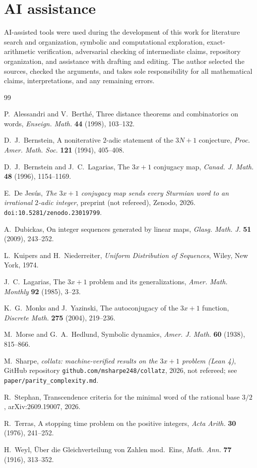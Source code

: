 \documentclass[11pt]{amsart}
\theoremstyle{definition}
\theoremstyle{remark}
\begin{document}
\section*{AI assistance}

AI-assisted tools were used during the development of this work for literature search and organization, symbolic and computational exploration, exact-arithmetic verification, adversarial checking of intermediate claims, repository organization, and assistance with drafting and editing. The author selected the sources, checked the arguments, and takes sole responsibility for all mathematical claims, interpretations, and any remaining errors.

\begin{thebibliography}{99}

 P.~Alessandri and V.~Berth\'e, Three distance theorems and combinatorics on words, \emph{Enseign. Math.} \textbf{44} (1998), 103--132.

 D.~J.~Bernstein, A noniterative $2$-adic statement of the $3N+1$ conjecture, \emph{Proc. Amer. Math. Soc.} \textbf{121} (1994), 405--408.

 D.~J.~Bernstein and J.~C.~Lagarias, The $3x+1$ conjugacy map, \emph{Canad. J. Math.} \textbf{48} (1996), 1154--1169.

 E.~De Jes\'us, \emph{The $3x+1$ conjugacy map sends every Sturmian word to an irrational $2$-adic integer}, preprint (not refereed), Zenodo, 2026. \texttt{doi:10.5281/zenodo.23019799}.

 A.~Dubickas, On integer sequences generated by linear maps, \emph{Glasg. Math. J.} \textbf{51} (2009), 243--252.

 L.~Kuipers and H.~Niederreiter, \emph{Uniform Distribution of Sequences}, Wiley, New York, 1974.

 J.~C.~Lagarias, The $3x+1$ problem and its generalizations, \emph{Amer. Math. Monthly} \textbf{92} (1985), 3--23.

 K.~G.~Monks and J.~Yazinski, The autoconjugacy of the $3x+1$ function, \emph{Discrete Math.} \textbf{275} (2004), 219--236.

 M.~Morse and G.~A.~Hedlund, Symbolic dynamics, \emph{Amer. J. Math.} \textbf{60} (1938), 815--866.

 M.~Sharpe, \emph{collatz: machine-verified results on the $3x+1$ problem (Lean 4)}, GitHub repository \texttt{github.com/msharpe248/collatz}, 2026, not refereed; see \texttt{paper/parity\_complexity.md}.

 R.~Stephan, Transcendence criteria for the minimal word of the rational base $3/2$, arXiv:2609.19007, 2026.

 R.~Terras, A stopping time problem on the positive integers, \emph{Acta Arith.} \textbf{30} (1976), 241--252.

 H.~Weyl, \"Uber die Gleichverteilung von Zahlen mod.~Eins, \emph{Math. Ann.} \textbf{77} (1916), 313--352.

\end{thebibliography}
\end{document}
